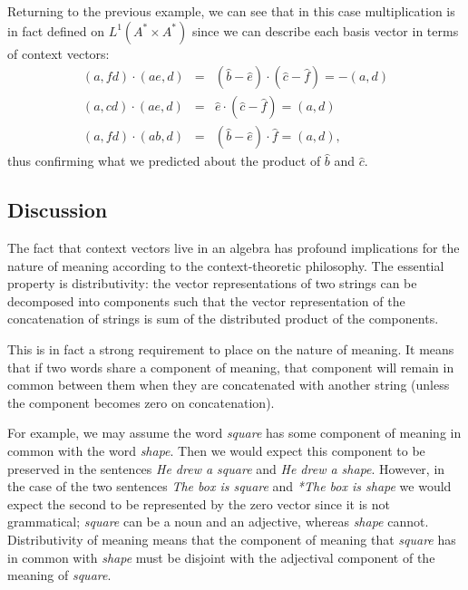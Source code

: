 
Returning to the previous example, we can see that in this case multiplication is in fact defined on $L^1(A^*\times A^*)$ since we can describe each basis vector in terms of context vectors:
\begin{eqnarray*}
(a,fd)\cdot(ae,d) &=& (\hat{b} - \hat{e})\cdot(\hat{c} - \hat{f}) = -(a,d)\\
(a,cd)\cdot(ae,d) &=& \hat{e}\cdot(\hat{c} - \hat{f}) = (a,d)\\
(a,fd)\cdot(ab,d) &=& (\hat{b} - \hat{e})\cdot\hat{f} = (a,d),
\end{eqnarray*}
thus confirming what we predicted about the product of $\hat{b}$ and $\hat{c}$.

\subsection{Discussion}

The fact that context vectors live in an algebra has profound implications for the nature of meaning according to the context-theoretic philosophy. The essential property is distributivity: the vector representations of two strings can be decomposed into components such that the vector representation of the concatenation of strings is sum of the distributed product of the components.

This is in fact a strong requirement to place on the nature of meaning. It means that if two words share a component of meaning, that component will remain in common between them when they are concatenated with another string (unless the component becomes zero on concatenation).

For example, we may assume the word \emph{square} has some component of meaning in common with the word \emph{shape}. Then we would expect this component to be preserved in the sentences \emph{He drew a square} and \emph{He drew a shape}. However, in the case of the two sentences \emph{The box is square} and \emph{*The box is shape} we would expect the second to be represented by the zero vector since it is not grammatical; \emph{square} can be a noun and an adjective, whereas \emph{shape} cannot. Distributivity of meaning means that the component of meaning that \emph{square} has in common with \emph{shape} must be disjoint with the adjectival component of the meaning of \emph{square}.

